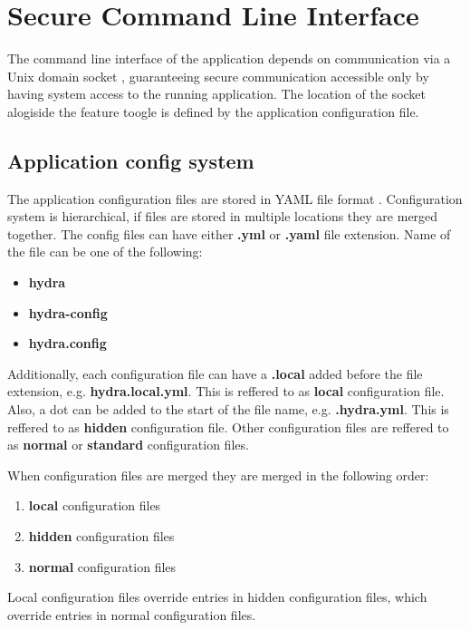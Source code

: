 \documentclass[../main.tex]{subfiles}
\begin{document}
\section{Secure Command Line Interface}

The command line interface of the application depends on communication via a Unix domain socket \cite{unix_domain_socket},
guaranteeing secure communication accessible only by having system access to the running application.
The location of the socket alogiside the feature toogle is defined by the application configuration file.

\subsection{Application config system}

The application configuration files are stored in YAML file format \cite{yaml}.
Configuration system is hierarchical, if files are stored in multiple locations they are merged together.
The config files can have either \textbf{.yml} or \textbf{.yaml} file extension.
Name of the file can be one of the following:
\begin{itemize}
  \item \textbf{hydra}
  \item \textbf{hydra-config}
  \item \textbf{hydra.config}
\end{itemize}

Additionally, each configuration file can have a \textbf{.local} added before the file extension, e.g. \textbf{hydra.local.yml}. This is reffered to as \textbf{local} configuration file.
Also, a dot can be added to the start of the file name, e.g. \textbf{.hydra.yml}. This is reffered to as \textbf{hidden} configuration file. Other configuration files are reffered to as \textbf{normal} or \textbf{standard} configuration files.

When configuration files are merged they are merged in the following order:
\begin{enumerate}
  \item \textbf{local} configuration files
  \item \textbf{hidden} configuration files
  \item \textbf{normal} configuration files
\end{enumerate}

Local configuration files override entries in hidden configuration files, which override entries in normal configuration files.
\end{document}
